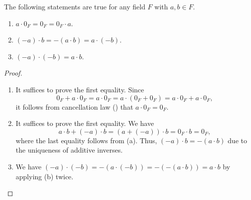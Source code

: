 \begin{theorem}
  The following statements are true for any field $F$ with $a, b \in F$.
  \begin{enumerate}
    \item $a \cdot 0_F = 0_F = 0_F \cdot a$.
    \item $(-a) \cdot b = -(a \cdot b) = a \cdot (-b)$.
    \item $(-a) \cdot (-b) = a \cdot b$.
  \end{enumerate}
\end{theorem}
\begin{proof}
  \leavevmode
  \begin{enumerate}
    \item It suffices to prove the first equality.
    Since
    \begin{equation*}
      0_F + a \cdot 0_F
      = a \cdot 0_F
      = a \cdot (0_F + 0_F)
      = a \cdot 0_F + a \cdot 0_F,
    \end{equation*}
    it follows from cancellation law () that
    $a \cdot 0_F = 0_F$.
    \item It suffices to prove the first equality.
    We have
    \begin{equation*}
      a \cdot b + (-a) \cdot b
      = (a + (-a)) \cdot b
      = 0_F \cdot b
      = 0_F,
    \end{equation*}
    where the last equality follows from (a).
    Thus, $(-a) \cdot b = -(a \cdot b)$ due to the uniqueness of additive
    inverses.
    \item We have $(-a) \cdot (-b) = -(a \cdot (-b)) = -(-(a \cdot b))
    = a \cdot b$ by applying (b) twice.
    \qedhere
  \end{enumerate}
\end{proof}

